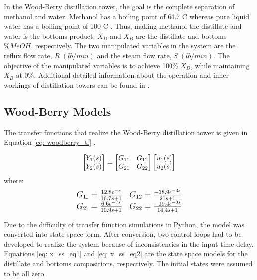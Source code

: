 In the Wood-Berry distillation tower, the goal is the complete separation of methanol and water.  Methanol has a boiling point of 64.7 \textdegree C whereas pure liquid water has a boiling point of 100 \textdegree C \cite{sonntag_thermo}. Thus, making methanol the distillate and water is the bottoms product. $X_D$ and $X_B$ are the distillate and bottoms $\%MeOH$, respectively. The two manipulated variables in the system are the reflux flow rate, $R \; (lb/min)$ and the steam flow rate, $S \; (lb/min)$.  The objective of the manipulated variables is to achieve 100\% $X_D$, while maintaining $X_B$ at 0\%. Additional detailed information about the operation and inner workings of distillation towers can be found in \cite{henry_distillation}.  

\subsection{Wood-Berry Models}
The transfer functions that realize  the Wood-Berry distillation tower is given in Equation \ref{eq: woodberry_tf} \cite{mpc_for_distillation_tower}.

\begin{equation}
    \centering
    \begin{bmatrix}
        Y_1(s) \\
        Y_2(s) 
    \end{bmatrix}
    =
    \begin{bmatrix}
        G_{11}  & G_{12} \\
        G_{21}  & G_{22}
    \end{bmatrix}
    \begin{bmatrix}
        u_1(s) \\
        u_2(s)
    \end{bmatrix}
    \label{eq: woodberry_tf}
\end{equation}
where: 
\begin{equation}
    \centering
        {\large
        \begin{matrix}
            G_{11} = \frac{12.8e^{-s}}{16.7s + 1}     &     G_{12} = \frac{-18.9e^{-3s}}{21s + 1} \\
            G_{21} = \frac{6.6e^{-7s}}{10.9s + 1}     &     G_{22} = \frac{-19.4e^{-3s}}{14.4s + 1}
        \end{matrix}}
    \label{eq: transfer_functions_woodberry}
\end{equation}

Due to the difficulty of transfer function simulations in Python, the model was converted into state space form.  After conversion, two control loops had to be developed to realize the system because of inconsistencies in the input time delay.  Equations \ref{eq: x_ss_eq1} and \ref{eq: x_ss_eq2} are the state space models for the distillate and bottoms compositions, respectively.  The initial states were assumed to be all zero.

